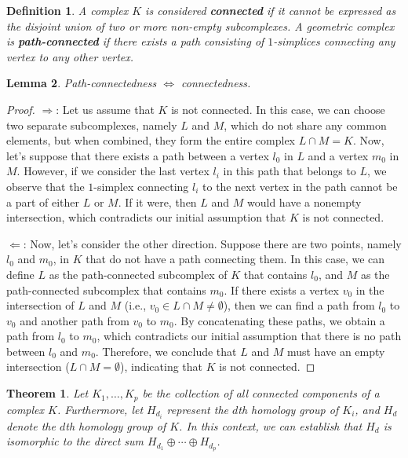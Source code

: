 \documentclass{article}
\newtheorem{theorem}[section]{Theorem}
\newtheorem{definition}{Definition}[section]
\newtheorem{lemma}[definition]{Lemma}
\begin{document}
\begin{definition}
A complex $K$ is considered \textbf{connected} if it cannot be expressed as the disjoint union of two or more non-empty subcomplexes. A geometric complex is \textbf{path-connected} if there exists a path consisting of $1$-simplices connecting any vertex to any other vertex.
\end{definition}

\begin{lemma}
\label{pathconnect}
Path-connectedness $\Longleftrightarrow$ connectedness.
\end{lemma}

\begin{proof}
\glqq $\Longrightarrow$\grqq{}: Let us assume that $K$ is not connected. In this case, we can choose two separate subcomplexes, namely $L$ and $M$, which do not share any common elements, but when combined, they form the entire complex $L \cap M = K$. Now, let's suppose that there exists a path between a vertex $l_0$ in $L$ and a vertex $m_0$ in $M$. However, if we consider the last vertex $l_i$ in this path that belongs to $L$, we observe that the $1$-simplex connecting $l_i$ to the next vertex in the path cannot be a part of either $L$ or $M$. If it were, then $L$ and $M$ would have a nonempty intersection, which contradicts our initial assumption that $K$ is not connected.

\glqq $\Longleftarrow$\grqq{}: Now, let's consider the other direction. Suppose there are two points, namely $l_0$ and $m_0$, in $K$ that do not have a path connecting them. In this case, we can define $L$ as the path-connected subcomplex of $K$ that contains $l_0$, and $M$ as the path-connected subcomplex that contains $m_0$. If there exists a vertex $v_0$ in the intersection of $L$ and $M$ (i.e., $v_0 \in L \cap M \neq \emptyset$), then we can find a path from $l_0$ to $v_0$ and another path from $v_0$ to $m_0$. By concatenating these paths, we obtain a path from $l_0$ to $m_0$, which contradicts our initial assumption that there is no path between $l_0$ and $m_0$. Therefore, we conclude that $L$ and $M$ must have an empty intersection ($L\cap M= \emptyset$), indicating that $K$ is not connected.
\end{proof}

\begin{theorem}
Let $K_1, \ldots, K_p$ be the collection of all connected components of a complex $K$. Furthermore, let $H_{d_i}$ represent the $d$th homology group of $K_i$, and $H_d$ denote the $d$th homology group of $K$. In this context, we can establish that $H_d$ is isomorphic to the direct sum $H_{d_1} \oplus \cdots \oplus H_{d_p}$.
\end{theorem}
\end{document}
